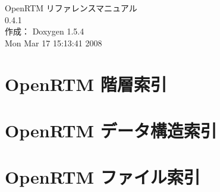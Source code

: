 \documentclass[a4paper]{book}
\begin{document}
\begin{titlepage}
\vspace*{7cm}
\begin{center}
{\Large OpenRTM リファレンスマニュアル\\[1ex]\large 0.4.1 }\\
\vspace*{1cm}
{\large 作成： Doxygen 1.5.4}\\
\vspace*{0.5cm}
{\small Mon Mar 17 15:13:41 2008}\\
\end{center}
\end{titlepage}
\clearemptydoublepage
{}
\tableofcontents
\clearemptydoublepage
{}
\chapter{OpenRTM 階層索引}

\chapter{OpenRTM データ構造索引}

\chapter{OpenRTM ファイル索引}

\end{document}
